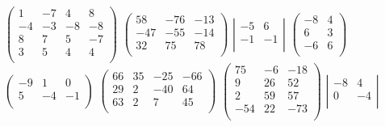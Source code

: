  $\left(
\begin{array}{cccc}
1 & -7 & 4 & 8\\
-4 & -3 & -8 & -8\\
8 & 7 & 5 & -7\\
3 & 5 & 4 & 4\\
\end{array}
\right)
$ 
\vfill
 $\left(
\begin{array}{ccc}
58 & -76 & -13\\
-47 & -55 & -14\\
32 & 75 & 78\\
\end{array}
\right)
$ 
\hspace{\fill}
 $\left|
\begin{array}{cc}
-5 & 6\\
-1 & -1\\
\end{array}
\right|
$ 
\vfill
 $\left(
\begin{array}{cc}
-8 & 4\\
6 & 3\\
-6 & 6\\
\end{array}
\right)
$ 
\hspace{\fill}
 $\left(
\begin{array}{ccc}
-9 & 1 & 0\\
5 & -4 & -1\\
\end{array}
\right)
$ 
\vfill
 $\left(
\begin{array}{ccc|c}
66 & 35 & -25 & -66\\
29 & 2 & -40 & 64\\
63 & 2 & 7 & 45\\
\end{array}
\right)
$ 
\hspace{\fill}
 $\left(
\begin{array}{ccc}
75 & -6 & -18\\
9 & 26 & 52\\
2 & 59 & 57\\
-54 & 22 & -73\\
\end{array}
\right)
$ 
\hspace{\fill}
\newpage
 $\left|
\begin{array}{cc}
-8 & 4\\
0 & -4\\
\end{array}
\right|
$ 
\hspace{\fill}
